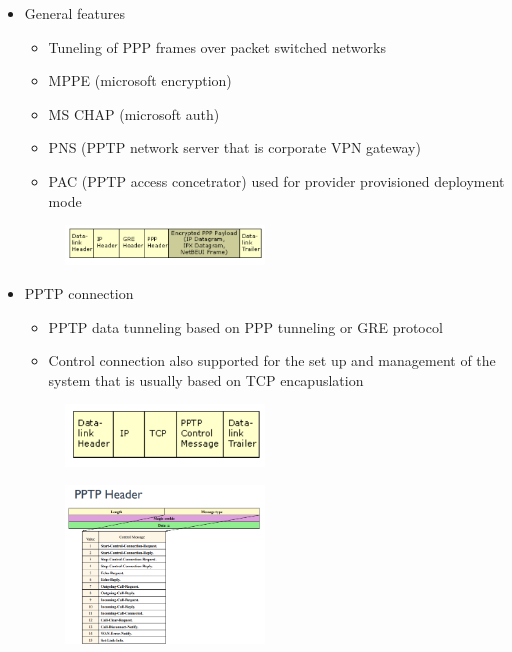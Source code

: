 \documentclass{article}
\begin{document}
\begin{itemize}
    \item General features
    \begin{itemize}
        \item Tuneling of PPP frames over packet switched networks
        \item MPPE (microsoft encryption)
        \item MS CHAP (microsoft auth)
        \item PNS (PPTP network server that is corporate VPN gateway)
        \item PAC (PPTP access concetrator) used for provider provisioned deployment mode
    \end{itemize}
    \begin{figure}[H]
        \centering
        \includegraphics[width=0.50\textwidth]{figure/data_tunneling.png}
    \end{figure}
    \item PPTP connection
    \begin{itemize}
        \item PPTP data tunneling based on PPP tunneling or GRE protocol
        \item Control connection also supported for the set up and management of the system that is usually based on TCP encapuslation
    \end{itemize}
    \begin{figure}[H]
        \centering
        \includegraphics[width=0.50\textwidth]{figure/control_connection.png}
    \end{figure}
    \begin{figure}[H]
        \centering
        \includegraphics[width=0.50\textwidth]{figure/PPTP_header.png}
    \end{figure}
\end{itemize}
\end{document}
